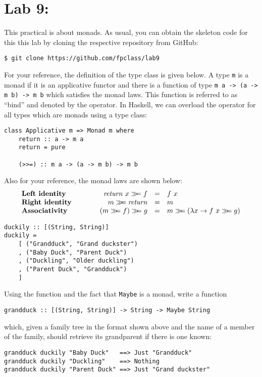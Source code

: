 \section{Lab 9: \practicalEightTitle}

This practical is about monads. As usual, you can obtain the skeleton code for this this lab by cloning the respective repository from GitHub:
\begin{verbatim}
$ git clone https://github.com/fpclass/lab9
\end{verbatim}
For your reference, the definition of the  type class is given below. A type \texttt{\small m} is a monad if it is an applicative functor and there is a function of type \texttt{\small m~a -> (a -> m~b) -> m~b} which satisfies the monad laws. This function is referred to as ``bind'' and denoted by the  \haskellIn{(>>=)} operator. In Haskell, we can overload the \haskellIn{(>>=)} operator for all types which are monads using a type class:
\begin{verbatim}
class Applicative m => Monad m where 
    return :: a -> m a 
    return = pure 
    
    (>>=) :: m a -> (a -> m b) -> m b
\end{verbatim}
Also for your reference, the monad laws are shown below:
\begin{displaymath}
\begin{array}{lcrcl}
\textbf{Left identity} &\qquad & \mathit{return}~x \bind f & = & f~x \\
\textbf{Right identity} &\qquad & m \bind \mathit{return} & = & m \\
\textbf{Associativity} & \qquad & (m \bind f) \bind g & = & m \bind (\lambda x \to f~x \bind g)
\end{array}
\end{displaymath}

\taskLine 

\begin{verbatim}
duckily :: [(String, String)]
duckily =
    [ ("Grandduck", "Grand duckster")
    , ("Baby Duck", "Parent Duck")
    , ("Duckling", "Older duckling")
    , ("Parent Duck", "Grandduck")
    ]
\end{verbatim}
Using the  function and the fact that \texttt{\small Maybe} is a monad, write a function 
\begin{verbatim}
grandduck :: [(String, String)] -> String -> Maybe String
\end{verbatim}
which, given a family tree in the format shown above and the name of a member of the family, should retrieve its grandparent if there is one known:
\begin{verbatim}
grandduck duckily "Baby Duck"   ==> Just "Grandduck"
grandduck duckily "Duckling"    ==> Nothing
grandduck duckily "Parent Duck" ==> Just "Grand duckster"
\end{verbatim}

